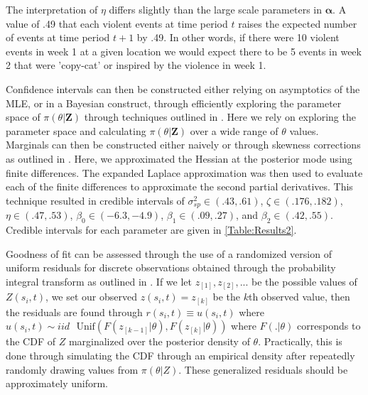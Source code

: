 \documentclass[11pt]{isuthesis}
\begin{document}
	The interpretation of $\eta$ differs slightly than the large scale parameters in $\boldsymbol{\alpha}$.  A value of .49 that each violent events at time period $t$ raises the expected number of events at time period $t+1$ by .49.  In other words, if there were 10 violent events in week 1 at a given location we would expect there to be 5 events in week 2 that were 'copy-cat' or inspired by the violence in week 1.
	
	Confidence intervals can then be constructed either relying on asymptotics of the MLE, or in a Bayesian construct, through efficiently exploring the parameter space of $\pi(\theta|\boldsymbol{Z})$ through techniques outlined in \cite{rue2009approximate}.  Here we rely on exploring the parameter space and calculating $\pi(\theta|\boldsymbol{Z})$ over a wide range of $\theta$ values.  Marginals can then be constructed either naively or through skewness corrections as outlined in \cite{martins2013bayesian}.  Here, we approximated the Hessian at the posterior mode using finite differences.  The expanded Laplace approximation was then used to evaluate each of the finite differences to approximate the second partial derivatives.  This technique resulted in credible intervals of $\sigma_{sp}^2 \in (.43,.61)$, $\zeta \in (.176,.182)$, $\eta \in (.47,.53)$, $\beta_0 \in (-6.3,-4.9)$, $\beta_1 \in (.09,.27)$, and $\beta_2 \in (.42,.55)$.  Credible intervals for each parameter are given in \ref{Table:Results2}.
	
	Goodness of fit can be assessed through the use of a randomized version of uniform residuals for discrete observations obtained through the probability integral transform as outlined in \cite{brillinger1982maximum}.  If we let $z_{[1]},z_{[2]},...$ be the possible values of $Z(s_i,t)$, we set our observed $z(s_i,t)=z_{[k]}$ be the $k$th observed value, then the residuals are found through $r(s_i,t)\equiv u(s_i,t)$ where $u(s_i,t)\sim iid\text{ }\mbox{Unif}(F(z_{[k-1]}|\theta),F(z_{[k]}|\theta))$ where $F(.|\theta)$ corresponds to the CDF of $Z$ marginalized over the posterior density of $\theta$.  Practically, this is done through simulating the CDF through an empirical density after repeatedly randomly drawing values from $\pi(\theta|Z)$.  These generalized residuals should be approximately uniform.
	
\end{document}
